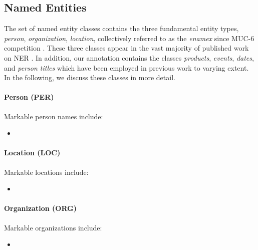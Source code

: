 \documentclass[11pt]{article}
\begin{document}
\subsection{Named Entities}
\label{sec: named entities}

The set of named entity classes contains the three fundamental entity types, \textit{person}, \textit{organization}, \textit{location}, collectively referred to as the \textit{enamex} since MUC-6 competition \citep{grishman1996}. These three classes appear in the vast majority of published work on NER \citep{nadeau2007}. In addition, our annotation contains the classes \textit{products}, \textit{events}, \textit{dates}, and \textit{person titles} which have been employed in previous work to varying extent. In the following, we discuss these classes in more detail.


\paragraph{Person (PER)}

Markable person names include:

\begin{itemize}

\item[]

\end{itemize}


\paragraph{Location (LOC)}

Markable locations include:

\begin{itemize}

\item[]

\end{itemize}


\paragraph{Organization (ORG)}

Markable organizations include:

\begin{itemize}

\item[]

\end{itemize}
\end{document}
